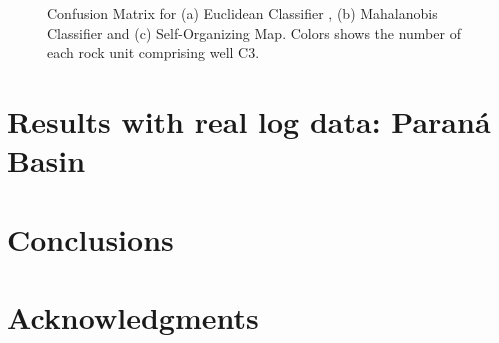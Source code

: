 \documentclass[preprint,12pt]{elsarticle}
\begin{document}
\begin{figure}[ht!]
\begin{center}
		\caption{ Confusion Matrix for (a) Euclidean Classifier , (b) Mahalanobis Classifier and (c) Self-Organizing Map. Colors shows the number of each rock unit comprising well C3.}
		\label{fig:CM_C3}
	\end{center}
\end{figure}

\section{Results with real log data: Paran\'a Basin}
\label{sub:Real}



\section{Conclusions}
\label{sec:Conc}

\section{Acknowledgments}
\label{sec:Ackn}





\pagebreak
{}

\end{document}

